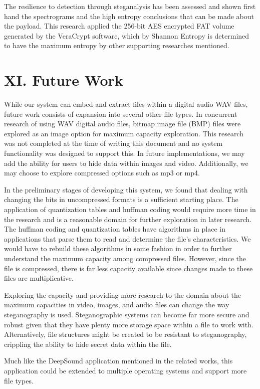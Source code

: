 \documentclass[letterpaper]{article}
\begin{document}
The resilience to detection through steganalysis has been assessed and shown first hand the spectrograms and the high entropy conclusions that can be made about the payload. This research applied the 256-bit AES encrypted FAT volume generated by the VeraCrypt software, which by Shannon Entropy is determined to have the maximum entropy by other supporting researches mentioned.



\section{XI. Future Work}
While our system can embed and extract files within a digital audio WAV files, future work consists of expansion into several other file types. In concurrent research of using WAV digital audio files, bitmap image file (BMP) files were explored as an image option for maximum capacity exploration. This research was not completed at the time of writing this document and no system functionality was designed to support this. In future implementations, we may add the ability for users to hide data within images and video. Additionally, we may choose to explore compressed options such as mp3 or mp4. 

In the preliminary stages of developing this system, we found that dealing with changing the bits in uncompressed formats is a sufficient starting place. The application of quantization tables and huffman coding would require more time in the research and is a reasonable domain for further exploration in later research. The huffman coding and quantization tables have algorithms in place in applications that parse them to read and determine the file's characteristics. We would have to rebuild these algorithms in some fashion in order to further understand the maximum capacity among compressed files. However, since the file is compressed, there is far less capacity available since changes made to these files are multiplicative.

Exploring the capacity and providing more research to the domain about the maximum capacities in video, images, and audio files can change the way steganography is used. Steganographic systems can become far more secure and robust given that they have plenty more storage space within a file to work with. Alternatively, file structures might be created to be resistant to steganography, crippling the ability to hide secret data within the file. 

Much like the DeepSound application mentioned in the related works, this application could be extended to multiple operating systems and support more file types.
\end{document}
